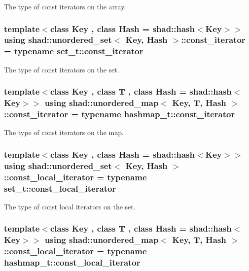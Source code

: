 The type of const iterators on the array. 

\hypertarget{group__Types_ga074f67d0516c3a68d8c79976aef62fb1}{
\subsubsection[{const\-\_\-iterator}]{\setlength{\rightskip}{0pt plus 5cm}template$<$class Key , class Hash  = shad\-::hash$<$\-Key$>$$>$ using {\bf shad\-::unordered\-\_\-set}$<$ Key, Hash $>$\-::const\-\_\-iterator =  typename set\-\_\-t\-::const\-\_\-iterator}}\label{group__Types_ga074f67d0516c3a68d8c79976aef62fb1}


The type of const iterators on the set. 

\hypertarget{group__Types_ga102c3cd521767bf4b22f3788ccc054e8}{
\subsubsection[{const\-\_\-iterator}]{\setlength{\rightskip}{0pt plus 5cm}template$<$class Key , class T , class Hash  = shad\-::hash$<$\-Key$>$$>$ using {\bf shad\-::unordered\-\_\-map}$<$ Key, T, Hash $>$\-::const\-\_\-iterator =  typename hashmap\-\_\-t\-::const\-\_\-iterator}}\label{group__Types_ga102c3cd521767bf4b22f3788ccc054e8}


The type of const iterators on the map. 

\hypertarget{group__Types_gac14878d16fabddc52f8dd35465f3155e}{
\subsubsection[{const\-\_\-local\-\_\-iterator}]{\setlength{\rightskip}{0pt plus 5cm}template$<$class Key , class Hash  = shad\-::hash$<$\-Key$>$$>$ using {\bf shad\-::unordered\-\_\-set}$<$ Key, Hash $>$\-::const\-\_\-local\-\_\-iterator =  typename set\-\_\-t\-::const\-\_\-local\-\_\-iterator}}\label{group__Types_gac14878d16fabddc52f8dd35465f3155e}


The type of const local iterators on the set. 

\hypertarget{group__Types_ga2242fb2071462a5f8a420d8cd8a7d8e8}{
\subsubsection[{const\-\_\-local\-\_\-iterator}]{\setlength{\rightskip}{0pt plus 5cm}template$<$class Key , class T , class Hash  = shad\-::hash$<$\-Key$>$$>$ using {\bf shad\-::unordered\-\_\-map}$<$ Key, T, Hash $>$\-::const\-\_\-local\-\_\-iterator =  typename hashmap\-\_\-t\-::const\-\_\-local\-\_\-iterator}}\label{group__Types_ga2242fb2071462a5f8a420d8cd8a7d8e8}


